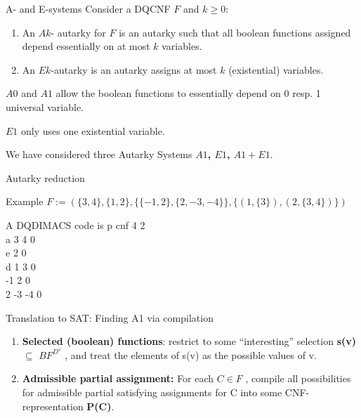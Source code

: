 \documentclass[xcolor=table	]{beamer}
\begin{document}
\begin{frame}{A- and E-systems}
Consider a DQCNF $F$ and $k \geq 0$: \newline
\begin{enumerate}
    \item An $Ak$- autarky for $F$ is an autarky such that all boolean functions assigned depend essentially on at most $k$ variables.
    \item An $Ek$-autarky is an autarky assigns at most $k$ (existential) variables. 
\end{enumerate}

\vspace{0.4cm}

  $A0$ and $A1$ allow the boolean functions to essentially \newline  
  depend on 0 resp. 1 universal variable. \newline 

  $E1$ only uses one existential variable. \newline 
  
  We have considered three Autarky Systems \newline 
  \textbf{$A1$, $E1$, $A1 + E1$}.

\end{frame}
\begin{frame}{Autarky reduction}
 \begin{exampleblock}{Example}
    {
  $ F := (\{3,4\}, \{1,2\}, \{\{-1,2\},\{2,-3,-4\}\}, \{(1,\{3\}), (2,\{3,4\})\})$    
    }
    \end{exampleblock}

\begin{exampleblock}{A DQDIMACS code is}
    {
p cnf 4 2 \\
a 3 4 0 \\
e 2 0 \\
d 1 3 0 \\
-1 2 0 \\
2 -3 -4 0 \\       
    }
    \end{exampleblock}
    \vspace{0.2cm}
\end{frame}

\begin{frame}{Translation to SAT: Finding A1 via compilation}
\begin{enumerate}
    \item \textbf{Selected (boolean) functions}: restrict to some “interesting” selection \textbf{s(v)} $\subseteq$ $BF^{D^v}$ , and treat the elements of s(v) as the possible values of v. \newline 
    
    \item \textbf{Admissible partial assignment:} For each $C \in F$ , compile all possibilities for admissible partial satisfying assignments for C into some CNF-representation \textbf{P(C)}.
\end{enumerate}

\end{frame}
\end{document}
